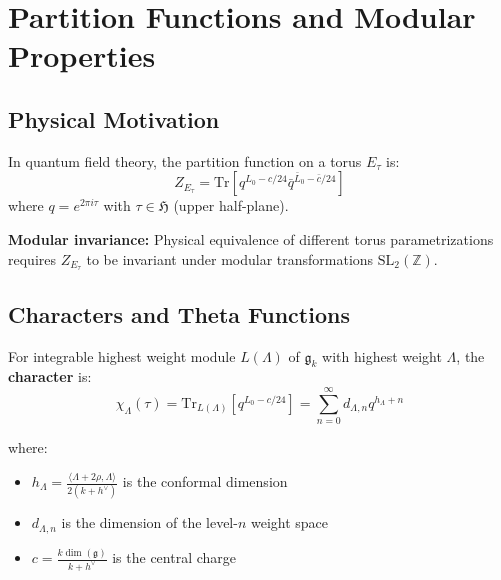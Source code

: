 
\section{Partition Functions and Modular Properties}
\label{sec:partition-functions-modular}

\subsection{Physical Motivation}

\begin{motivation}
In quantum field theory, the partition function on a torus $E_\tau$ is:
$$Z_{E_\tau} = \text{Tr}\left[q^{L_0 - c/24} \bar{q}^{\bar{L}_0 - \bar{c}/24}\right]$$
where $q = e^{2\pi i\tau}$ with $\tau \in \mathfrak{H}$ (upper half-plane).

\textbf{Modular invariance:} Physical equivalence of different torus parametrizations 
requires $Z_{E_\tau}$ to be invariant under modular transformations $\text{SL}_2(\mathbb{Z})$.
\end{motivation}

\subsection{Characters and Theta Functions}

\begin{definition}
\label{def:character-affine}
For integrable highest weight module $L(\Lambda)$ of $\widehat{\mathfrak{g}}_k$ with highest 
weight $\Lambda$, the \textbf{character} is:
$$\chi_\Lambda(\tau) = \text{Tr}_{L(\Lambda)}\left[q^{L_0 - c/24}\right] = \sum_{n=0}^\infty d_{\Lambda,n} q^{h_\Lambda + n}$$

where:
\begin{itemize}
\item $h_\Lambda = \frac{\langle\Lambda + 2\rho, \Lambda\rangle}{2(k+h^\vee)}$ is the conformal dimension
\item $d_{\Lambda,n}$ is the dimension of the level-$n$ weight space
\item $c = \frac{k\dim(\mathfrak{g})}{k+h^\vee}$ is the central charge
\end{itemize}
\end{definition}

